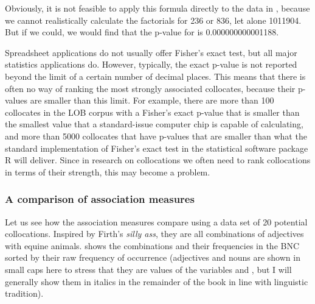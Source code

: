 Obviously, it is not feasible to apply this formula directly to the data in , because we cannot realistically calculate the factorials for 236 or 836, let alone \num{1011904}. But if we could, we would find that the p\hyp{}value for  is 0.000000000001188.

Spreadsheet applications do not usually offer Fisher's exact test,  but all major statistics  applications do. However, typically, the exact p\hyp{}value is not reported beyond the limit of a certain number of decimal places. This means that there is often no way of ranking the most strongly associated  collocates,  because their p\hyp{}values are smaller than this limit. For example, there are more than 100 collocates in the LOB  corpus with a Fisher's exact p\hyp{}value  that is smaller than the smallest value that a standard\hyp{}issue computer chip is capable of calculating, and more than 5000 collocates that have p\hyp{}values that are smaller than what the standard implementation of Fisher's exact test in the statistical software package R will deliver. Since in research on collocations  we often need to rank collocations in terms of their strength, this may become a problem.

\subsubsection{A comparison of association measures}
\label{sec:amcomparison}

Let us see how the association measures compare using a data set of 20 potential collocations.  Inspired by Firth's \textit{silly ass}, they are all combinations of adjectives  with equine animals.  shows the combinations and their frequencies  in the BNC  sorted by their raw frequency of occurrence (adjectives  and nouns  are shown in small caps here to stress that they are values of the variables  and , but I will generally show them in italics in the remainder of the book in line with linguistic tradition).

